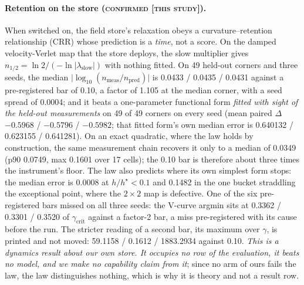 \documentclass{article} %
\begin{document}
\paragraph{Retention on the store (\textsc{confirmed [this study]}).} When switched on, the field
store's relaxation obeys a curvature--retention relationship (CRR) whose prediction is a
\emph{time}, not a score. On the damped velocity-Verlet map that the store deploys, the slow
multiplier gives $n_{1/2}=\ln2/(-\ln\lvert\lambda_{\text{slow}}\rvert)$ with nothing fitted. On 49
held-out corners and three seeds, the median $\lvert\log_{10}(n_{\text{meas}}/n_{\text{pred}})\rvert$ is
0.0433 / 0.0435 / 0.0431 against a pre-registered bar of 0.10, a factor of 1.105 at the median
corner, with a seed spread of 0.0004; and it beats a one-parameter functional form \emph{fitted with sight
of the held-out measurements} on 49 of 49 corners on every seed (mean paired $\Delta$ $-0.5968$ /
$-0.5796$ / $-0.5982$; that fitted form's own median error is 0.640132 / 0.623155 / 0.641281).
On an exact quadratic, where the law holds by construction, the same measurement chain recovers it
only to a median of 0.0349 (p90 0.0749, max 0.1601 over 17 cells); the 0.10 bar is therefore about
three times the instrument's floor. %
The law also predicts where its own simplest form stops: the median error is 0.0008 at $h/h^\star<0.1$
and 0.1482 in the one bucket straddling the exceptional point, where the $2\times2$ map is
defective. %
One of the six pre-registered bars missed on all three seeds: the V-curve argmin sits at 0.3362 /
0.3301 / 0.3520 of $\gamma_{\text{crit}}$ against a factor-2 bar, a miss pre-registered with its
cause before the run. The stricter reading of a second bar, its maximum over $\gamma$, is
printed and not moved: 59.1158 / 0.1612 / 1883.2934 against 0.10.
\emph{This is a dynamics result about our own store. It occupies no row of the evaluation, it
beats no model, and we make no capability claim from it}; since no arm of ours fails the law, the
law distinguishes nothing, which is why it is theory and not a result row.
\end{document}
